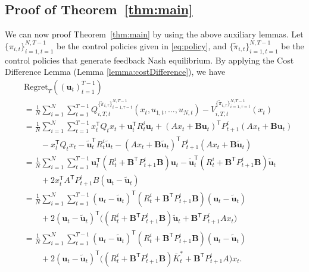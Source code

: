 \documentclass[letterpaper, 10 pt, conference]{ieeeconf}  %
\newcommand{\contTilde}[1]{\mathbf{\tilde{#1}}}
\newcommand{\transpose}{\mathsf{T}}
\begin{document}
\subsection{Proof of Theorem~\ref{thm:main}}
We can now proof Theorem~\ref{thm:main} by using the above auxiliary lemmas.
Let $\{\pi_{i,t}\}_{i=1,t=1}^{N,T-1}$ be the control policies given in \eqref{eq:policy}, and $\{\tilde{\pi}_{i,t}\}_{i=1,t=1}^{N,T-1}$ be the control policies that generate feedback Nash equilibrium.
By applying the Cost Difference Lemma (Lemma \ref{lemma:costDifference}), we have
\begin{align*}
    &\text{Regret}_{T}((\mathbf{u}_{t})_{t=1}^{T-1})\\
    &= \frac{1}{N}\sum_{i=1}^{N}\sum_{t=1}^{T-1} Q_{i,T,t}^{\{\tilde{\pi}_{i,\tau}\}_{i=1,\tau=t}^{N,T-1}}(x_{t},u_{1,t},...,u_{N,t}) -  V_{i,T,t}^{\{\tilde{\pi}_{i,\tau}\}_{i=1,\tau=t}^{N,T-1}}(x_{t})\\
    &= \frac{1}{N}\sum_{i=1}^{N}\sum_{t=1}^{T-1} x_{t}^{\transpose}Q_{t}x_{t} + \mathbf{u}_{t}^{\transpose}R_{t}^{i}\mathbf{u}_{t} + (Ax_{t}+\mathbf{B}\mathbf{u}_{t})^{\transpose}P_{t+1}^{i}(Ax_{t}+\mathbf{B}\mathbf{u}_{t})\\
    &\qquad - x_{t}^{\transpose}Q_{t}x_{t} - \contTilde{u}_{t}^{\transpose}R_{t}^{i}\contTilde{u}_{t} - (Ax_{t}+\mathbf{B}\contTilde{u}_{t})^{\transpose}P_{t+1}^{i}(Ax_{t}+\mathbf{B}\contTilde{u}_{t})\\
    &= \frac{1}{N}\sum_{i=1}^{N}\sum_{t=1}^{T-1} \mathbf{u}_{t}^{\transpose}(R_{t}^{i}+\mathbf{B}^{\transpose}P_{t+1}^{i}\mathbf{B})\mathbf{u}_{t}-\contTilde{u}_{t}^{\transpose}(R_{t}^{i}+\mathbf{B}^{\transpose}P_{t+1}^{i}\mathbf{B})\contTilde{u}_{t} \\
    &\qquad+ 2x_{t}^{\transpose}A^{\transpose}P_{t+1}^{i}B(\mathbf{u}_{t}-\contTilde{u}_{t})\\
    &= \frac{1}{N}\sum_{i=1}^{N}\sum_{t=1}^{T-1} (\mathbf{u}_{t}-\contTilde{u}_{t})^{\transpose}(R_{t}^{i}+\mathbf{B}^{\transpose}P_{t+1}^{i}\mathbf{B})(\mathbf{u}_{t}-\contTilde{u}_{t})\\
    &\qquad + 2(\mathbf{u}_{t}-\contTilde{u}_{t})^{\transpose}\bigg((R_{t}^{i}+\mathbf{B}^{\transpose}P_{t+1}^{i}\mathbf{B})\contTilde{u}_{t}+\mathbf{B}^{\transpose}P_{t+1}^{i}Ax_{t}\bigg)\\
    &= \frac{1}{N}\sum_{i=1}^{N}\sum_{t=1}^{T-1} (\mathbf{u}_{t}-\contTilde{u}_{t})^{\transpose}(R_{t}^{i}+\mathbf{B}^{\transpose}P_{t+1}^{i}\mathbf{B})(\mathbf{u}_{t}-\contTilde{u}_{t})\\
    &\qquad + 2(\mathbf{u}_{t}-\contTilde{u}_{t})^{\transpose}\bigg((R_{t}^{i}+\mathbf{B}^{\transpose}P_{t+1}^{i}\mathbf{B})\bar{K}_{t}^{*}+\mathbf{B}^{\transpose}P_{t+1}^{i}A\bigg)x_{t}.
\end{align*}
\end{document}
